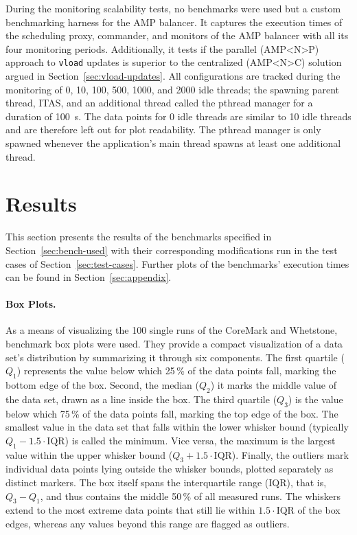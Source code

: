 During the monitoring scalability tests, no benchmarks were used but a custom benchmarking harness for the AMP balancer.
It captures the execution times of the scheduling proxy, commander, and monitors of the AMP balancer with all its four monitoring periods.
Additionally, it tests if the parallel (AMP<N>P) approach to \texttt{vload} updates is superior to the centralized (AMP<N>C) solution argued in Section~\ref{sec:vload-updates}.
All configurations are tracked during the monitoring of 0, 10, 100, 500, 1000, and 2000 idle threads; the spawning parent thread, ITAS, and an additional thread called the pthread manager for a duration of \SI{100}{\second}.
The data points for 0 idle threads are similar to 10 idle threads and are therefore left out for plot readability.
The pthread manager is only spawned whenever the application's main thread spawns at least one additional thread.

\section{Results}

This section presents the results of the benchmarks specified in Section~\ref{sec:bench-used} with their corresponding modifications run in the test cases of Section~\ref{sec:test-cases}.
Further plots of the benchmarks' execution times can be found in Section~\ref{sec:appendix}.

\paragraph{Box Plots.}

As a means of visualizing the 100 single runs of the CoreMark and Whetstone, benchmark box plots were used.
They provide a compact visualization of a data set's distribution by summarizing it through six components. 
The first quartile ($Q_1$) represents the value below which 25\,\% of the data points fall, marking the bottom edge of the box.
Second, the median ($Q_2$) it marks the middle value of the data set, drawn as a line inside the box.
The third quartile ($Q_3$) is the value below which 75\,\% of the data points fall, marking the top edge of the box.
The smallest value in the data set that falls within the lower whisker bound (typically $Q_1 - 1.5 \cdot \text{IQR}$) is called the minimum.
Vice versa, the maximum is the largest value within the upper whisker bound ($Q_3 + 1.5 \cdot \text{IQR}$).
Finally, the outliers mark individual data points lying outside the whisker bounds, plotted separately as distinct markers.
The box itself spans the interquartile range (IQR), that is, $Q_3 - Q_1$, and thus contains the middle 50\,\% of all measured runs.
The whiskers extend to the most extreme data points that still lie within $1.5 \cdot \text{IQR}$ of the box edges, whereas any values beyond this range are flagged as outliers.

